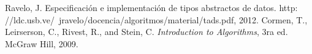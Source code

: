 \documentclass[titlepage]{article}
\begin{document}
	\begin{thebibliography}{}
		 Ravelo, J. Especificación e implementación de tipos abstractos de datos. http:
		//ldc.usb.ve/~jravelo/docencia/algoritmos/material/tads.pdf, 2012.
		 Cormen, T., Leirserson, C., Rivest, R., and Stein, C. \textit{Introduction to Algorithms}, 3ra ed. McGraw Hill, 2009.

	\end{thebibliography}
	
\end{document}
